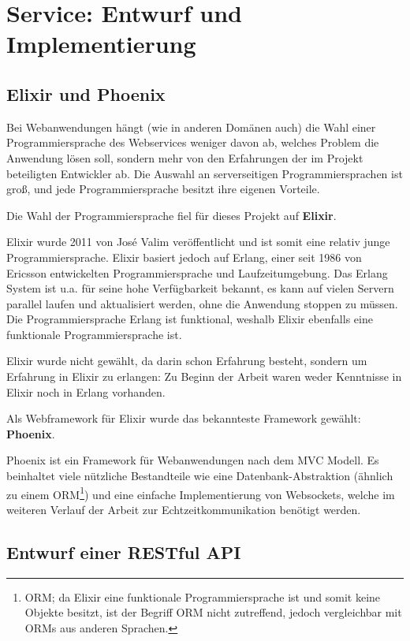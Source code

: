 \section{Service: Entwurf und Implementierung}

\subsection{Elixir und Phoenix}

Bei Webanwendungen hängt (wie in anderen Domänen auch) die Wahl einer Programmiersprache des Webservices weniger davon ab, welches Problem die Anwendung lösen soll, sondern mehr von den Erfahrungen der im Projekt beteiligten Entwickler ab. Die Auswahl an serverseitigen Programmiersprachen ist groß, und jede Programmiersprache besitzt ihre eigenen Vorteile.

Die Wahl der Programmiersprache fiel für dieses Projekt auf \textbf{Elixir}.

Elixir wurde 2011 von José Valim veröffentlicht und ist somit eine relativ junge Programmiersprache. Elixir basiert jedoch auf Erlang, einer seit 1986 von Ericsson entwickelten Programmiersprache und Laufzeitumgebung. Das Erlang System ist u.a. für seine hohe Verfügbarkeit bekannt, es kann auf vielen Servern parallel laufen und aktualisiert werden, ohne die Anwendung stoppen zu müssen. Die Programmiersprache Erlang ist funktional, weshalb Elixir ebenfalls eine funktionale Programmiersprache ist.

Elixir wurde nicht gewählt, da darin schon Erfahrung besteht, sondern um Erfahrung in Elixir zu erlangen: Zu Beginn der Arbeit waren weder Kenntnisse in Elixir noch in Erlang vorhanden.

Als Webframework für Elixir wurde das bekannteste Framework gewählt: \textbf{Phoenix}.

Phoenix ist ein Framework für Webanwendungen nach dem \ac{MVC} Modell. Es beinhaltet viele nützliche Bestandteile wie eine Datenbank-Abstraktion (ähnlich zu einem \acs{ORM}\footnote{\acf{ORM}; da Elixir eine funktionale Programmiersprache ist und somit keine Objekte besitzt, ist der Begriff \acs{ORM} nicht zutreffend, jedoch vergleichbar mit ORMs aus anderen Sprachen.}) und eine einfache Implementierung von Websockets, welche im weiteren Verlauf der Arbeit zur Echtzeitkommunikation benötigt werden.

\subsection{Entwurf einer RESTful API}


